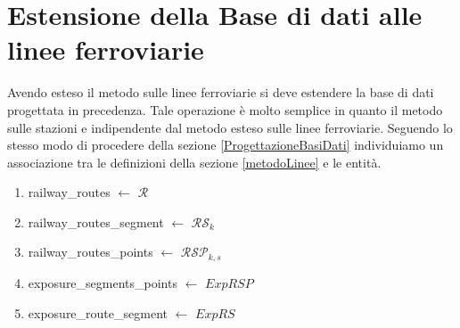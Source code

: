 
\chapter{Estensione della Base di dati alle linee ferroviarie} 
Avendo esteso il metodo sulle linee ferroviarie si deve estendere la base di dati 
progettata in precedenza. Tale operazione è molto semplice in quanto il metodo sulle stazioni e indipendente dal metodo esteso sulle linee ferroviarie.
Seguendo lo stesso modo di procedere della sezione \ref{ProgettazioneBasiDati} 
individuiamo un associazione tra le definizioni della sezione \ref{metodoLinee}
e le entità.
\begin{enumerate}
	\item railway\_routes $\leftarrow$ $\mathcal{R}$
	\item railway\_routes\_segment $\leftarrow$ $\mathcal{RS}_k$
	\item railway\_routes\_points $\leftarrow$ $\mathcal{RSP}_{k,s}$
	\item exposure\_segments\_points $\leftarrow$ $ExpRSP$
	\item exposure\_route\_segment $\leftarrow$ $ExpRS$
	
\end{enumerate}

